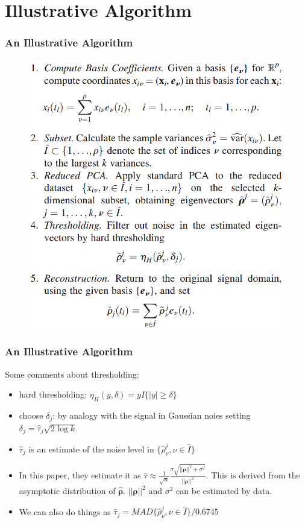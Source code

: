 \documentclass{beamer}
\begin{document}
	\section{Illustrative Algorithm}
	\begin{frame}
		\frametitle{An Illustrative Algorithm}
		\begin{figure}
			\includegraphics[width=0.6\linewidth]{image008.png}
		\end{figure}
	\end{frame}
	
	\begin{frame}
		\frametitle{An Illustrative Algorithm}
		Some comments about thresholding:
		\begin{itemize}
			\item
			hard thresholding: $\eta_H(y,\delta) = yI\{|y| \geq \delta\}$
			\item 
			choose $\delta_j$: by analogy with the signal in Gaussian noies setting $\delta_j = \hat{\tau}_j\sqrt{2\log k}$
			\item
			$\hat{\tau}_j$ is an estimate of the noise level in $\{\hat{\rho}^j_{\nu}, \nu\in\hat{I}\}$
			\item
			In this paper, they estimate it as $\hat{\tau}\approx \frac{1}{\sqrt{n}}\frac{\sigma\sqrt{||\bm{\rho}||^2 + \sigma^2}}{||\bm{\rho}||^2}$. This is derived from the asymptotic distribution of $\hat{\bm{\rho}}$. $||\bm{\rho}||^2$ and $\sigma^2$ can be estimated by data.
			\item
			We can also do things as $\hat{\tau}_j = MAD\{\hat{\rho}^j_{\nu}, \nu\in\hat{I}\}/0.6745$
		\end{itemize}
	\end{frame}
	
\end{document}
